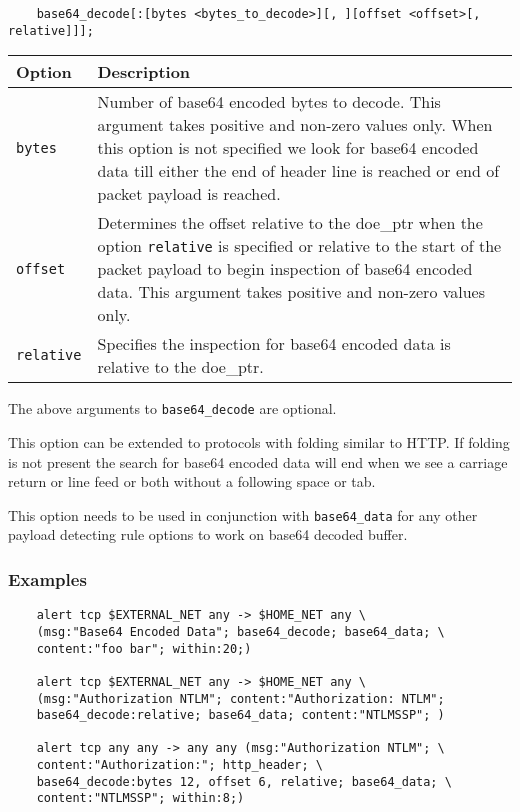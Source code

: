\documentclass[english]{report}
\newenvironment{note}{
\samepage
    \vspace{10pt}{\textsf{
        {\hspace{7pt}\Huge{$\triangle$\hspace{-12.5pt}{\Large{$^!$}}}}\hspace{5pt}
        {\Large{NOTE}}
    }
    }
   \begin{center}
    \par\vspace{-17pt}

    \begin{lrbox}{\savepar}
    \begin{minipage}[r]{6in}
}
{
    \end{minipage}
    \end{lrbox}
    \fbox{
        \usebox{
            \savepar
	}
    }
    \par\vskip10pt
    \end{center}
}
\newenvironment{note}{
        \begin{rawhtml}
        <p><table border="1"><tr><td><b>
        Note:&nbsp;&nbsp;</b>
        \end{rawhtml}
}{
        \begin{rawhtml}
        </b></td></tr></table></p>
        \end{rawhtml}
}
\begin{document}
\begin{verbatim}
	base64_decode[:[bytes <bytes_to_decode>][, ][offset <offset>[, relative]]];
\end{verbatim}

\begin{tabular}{| l | p{4.5in} |}
\hline
{\bf Option} & {\bf Description}\\
\hline
\hline
\texttt{bytes} & 

Number of base64 encoded bytes to decode. This argument takes positive and 
non-zero values only. When this option is not specified we look for base64
encoded data till either the end of header line is reached or end of packet
payload is reached.\\
\hline
\texttt{offset} & 

Determines the offset relative to the doe\_ptr when the option \texttt{relative} 
is specified or relative to the start of the packet payload to begin inspection 
of base64 encoded data. This argument takes positive and non-zero values only.\\
\hline
\texttt{relative} &

Specifies the inspection for base64 encoded data is relative to the doe\_ptr.\\

\hline
\end{tabular}

The above arguments to \texttt{base64\_decode} are optional.

\begin{note}

This option can be extended to protocols with folding similar to HTTP. If folding is not
present the search for base64 encoded data will end when we see a carriage return or line feed
or both without a following space or tab.

This option needs to be used in conjunction with \texttt{base64\_data} for any other 
payload detecting rule options to work on base64 decoded buffer.
\end{note}

\subsubsection{Examples}

\begin{verbatim}
    alert tcp $EXTERNAL_NET any -> $HOME_NET any \
	(msg:"Base64 Encoded Data"; base64_decode; base64_data; \
	content:"foo bar"; within:20;)

    alert tcp $EXTERNAL_NET any -> $HOME_NET any \
	(msg:"Authorization NTLM"; content:"Authorization: NTLM";
	base64_decode:relative; base64_data; content:"NTLMSSP"; )

    alert tcp any any -> any any (msg:"Authorization NTLM"; \
	content:"Authorization:"; http_header; \
	base64_decode:bytes 12, offset 6, relative; base64_data; \
	content:"NTLMSSP"; within:8;)
\end{verbatim}
\end{document}
